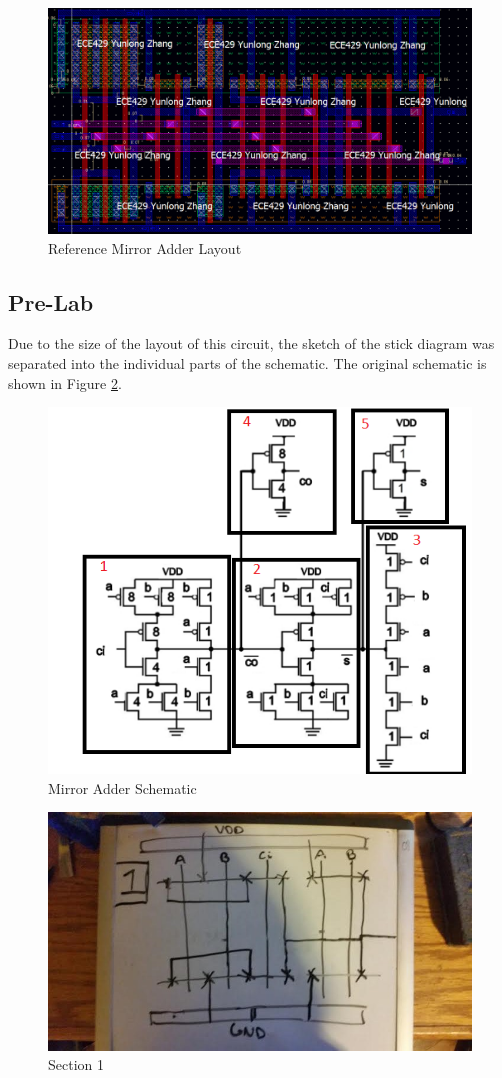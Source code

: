 \documentclass[12pt]{article}
\begin{document}
\begin{figure}[H]
\centering
\includegraphics[width=\linewidth]{ref}
\caption{Reference Mirror Adder Layout}
\label{fig:ref}
\end{figure}

\subsection{Pre-Lab}
Due to the size of the layout of this circuit, the sketch of the stick diagram was separated into the individual parts of the schematic. The original schematic is shown in Figure \ref{fig:mirror-schemat}.
\begin{figure}[H]
\centering
\includegraphics[width=0.7\linewidth]{mirror-schemat}
\caption{Mirror Adder Schematic}
\label{fig:mirror-schemat}
\end{figure}


\begin{figure}[H]
\centering
\includegraphics[width=0.7\linewidth]{pre-1}
\caption{Section 1}
\label{fig:pre-1}
\end{figure}
\end{document}
